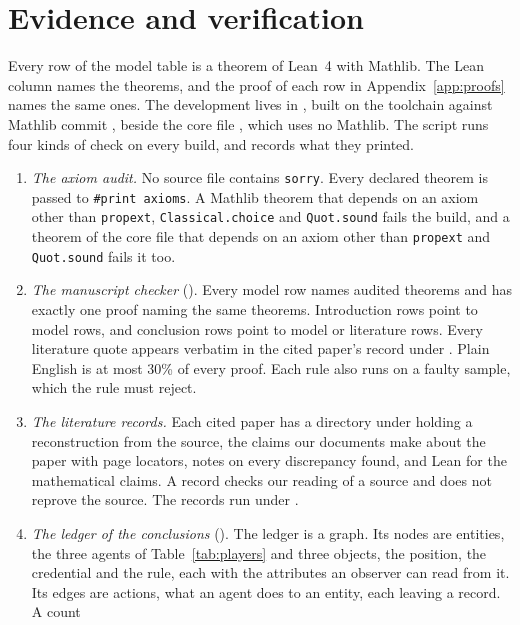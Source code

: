 \section{Evidence and verification}
\label{app:evidence}

Every row of the model table is a theorem of Lean~4 with Mathlib. The Lean
column names the theorems, and the proof of each row in
Appendix~\ref{app:proofs} names the same ones. The development lives in
, built on the toolchain  against Mathlib
commit , beside the core file , which
uses no Mathlib. The script  runs four kinds of check on every
build, and  records what they printed.

\begin{enumerate}
\item \emph{The axiom audit.} No source file contains \texttt{sorry}. Every
  declared theorem is passed to \texttt{\#print axioms}. A Mathlib theorem that
  depends on an axiom other than \texttt{propext}, \texttt{Classical.choice} and
  \texttt{Quot.sound} fails the build, and a theorem of the core file that
  depends on an axiom other than \texttt{propext} and \texttt{Quot.sound} fails
  it too.
\item \emph{The manuscript checker} ().
  Every model row names audited theorems and has exactly one proof naming the
  same theorems. Introduction rows point to model rows, and conclusion rows
  point to model or literature rows. Every literature quote appears verbatim
  in the cited paper's record under . Plain English is at most 30\%
  of every proof. Each rule also runs on a faulty sample, which the rule must
  reject.
\item \emph{The literature records.} Each cited paper has a directory under
   holding a reconstruction from the source, the claims our
  documents make about the paper with page locators, notes on every
  discrepancy found, and Lean for the mathematical claims. A record checks our
  reading of a source and does not reprove the source. The records run under
  .
\item \emph{The ledger of the conclusions} ().
  The ledger is a graph. Its nodes are entities, the three agents of
  Table~\ref{tab:players} and three objects, the position, the credential and
  the rule, each with the attributes an observer can read from it. Its edges
  are actions, what an agent does to an entity, each leaving a record. A count

\end{enumerate}
